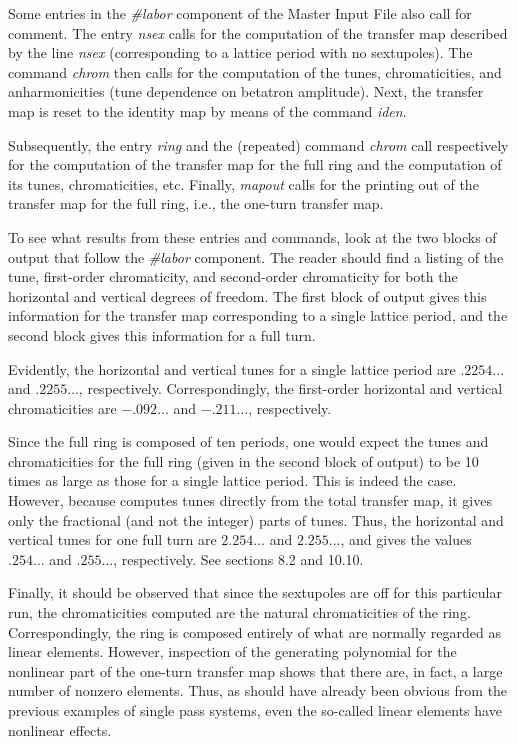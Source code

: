      Some entries in the {\em \#labor} component of the Master Input File also
call for comment.  The entry {\em nsex } calls for the computation of the transfer
map described by the line {\em nsex } (corresponding to a lattice period with no
sextupoles).  The command {\em chrom } then calls for the computation of the
tunes, chromaticities, and anharmonicities (tune dependence on betatron
amplitude).  Next, the transfer map is reset to the identity map by means
of the command {\em iden}.

     Subsequently, the entry {\em ring } and the (repeated) command {\em chrom } call
respectively for the computation of the transfer map for the full ring and
the computation of its tunes, chromaticities, etc.  Finally, {\em mapout } calls
for the printing out of the transfer map for the full ring, i.e., the
one-turn transfer map.

     To see what results from these entries and commands, look at the two
blocks of output that follow the {\em \#labor} component.  The reader should find
a listing of the tune, first-order chromaticity, and second-order
chromaticity for both the horizontal and vertical degrees of freedom.  The
first block of output gives this information for the transfer map
corresponding to a single lattice period, and the second block gives this
information for a full turn.

     Evidently, the horizontal and vertical tunes for a single lattice
period are $.2254\ldots$ and $.2255\ldots$, respectively.  Correspondingly, the
first-order horizontal and vertical chromaticities are $-.092\ldots$ and $-.211\ldots$, respectively.

     Since the full ring is composed of ten periods, one would expect the
tunes and chromaticities for the full ring (given in the second block of
output) to be 10 times as large as those for a single lattice period.
This is indeed the case.  However, because \Mary computes tunes directly
from the total transfer map, it gives only the fractional (and not the
integer) parts of tunes.  Thus, the horizontal and vertical tunes for one
full turn are $2.254\ldots$ and $2.255\ldots$, and \Mary gives the values $.254\ldots$
and $.255\ldots$, respectively.  See sections 8.2 and 10.10.

     Finally, it should be observed that since the sextupoles are off for
this particular \Mary run, the chromaticities computed are the natural
chromaticities of the ring.  Correspondingly, the ring is composed entirely
of what are normally regarded as linear elements.  However, inspection of
the generating polynomial for the nonlinear part of the one-turn transfer
map shows that there are, in fact, a large number of nonzero elements.
Thus, as should have already been obvious from the previous examples of
single pass systems, even the so-called linear elements have nonlinear
effects.

